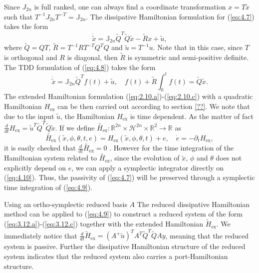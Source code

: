 Since $J_{2n}$ is full ranked, one can always find a coordinate transformation $ x= T \tilde x$ such that $T^{-1} J_{2n} T^{-T} = \mathbb J_{2n}$. The dissipative Hamiltonian formulation for (\ref{eq:4.7}) takes the form
\begin{equation} \label{eq:4.8}
	\dot {\tilde x} = \mathbb J_{2n} \tilde Q^T\tilde Q \tilde x - \tilde Rx + \tilde u,
\end{equation}
where $\tilde Q = QT$, $\tilde R = T^{-1}RT^{-T}Q^TQ$ and $\tilde u = T^{-1} u$. Note that in this case, since $T$ is orthogonal and $R$ is diagonal, then $\tilde R$ is symmetric and semi-positive definite. The TDD formulation of (\ref{eq:4.8}) takes the form
\begin{equation} \label{eq:4.9}
	\dot{\tilde x} = \mathbb{J}_{2n} \tilde Q^T f(t) + \tilde u, \quad f(t) + \tilde R \int_0^t f(t) = \tilde Q \tilde x.
\end{equation}
The extended Hamiltonian formulation (\ref{eq:2.10.a})-(\ref{eq:2.10.c}) with a quadratic Hamiltonian $H_{\text{ex}}$ can be then carried out according to section \ref{??}. We note that due to the input $\tilde u$, the Hamiltonian $H_{\text{ex}}$ is time dependent. As the matter of fact $\frac{d}{dt} H_{\text{ex}} = \tilde u^T\tilde Q^T \tilde Q \tilde x$. If we define $\overset{\circ}{H}_{\text{ex}} : \mathbb R^{2n}\times \mathcal H^{2n}\times \mathbb R^{2}\to \mathbb R$ as
\begin{equation} \label{eq:4.10}
	\overset{\circ}{H}_{\text{ex}}(\tilde x,\phi,\theta,t,e) = H_{\text{ex}}(\tilde x,\phi,\theta,t) + e, \quad \dot e = - \partial_t H_{\text{ex}},
\end{equation}
it is easily checked that $\frac d {dt} \overset{\circ}{H}_{\text{ex}} =0$ \cite{Hairer:1250576}. However for the time integration of the Hamiltonian system related to $\overset{\circ}{H}_{\text{ex}}$, since the evolution of $\tilde x$, $\phi$ and $\theta$ does not explicitly depend on $e$, we can apply a symplectic integrator directly on (\ref{eq:4.10}). Thus, the passivity of (\ref{eq:4.7}) will be preserved through a symplectic time integration of (\ref{eq:4.9}).

Using an ortho-symplectic reduced basis $A$ The reduced dissipative Hamiltonian method can be applied to (\ref{eq:4.9}) to construct a reduced system of the form (\ref{eq:3.12.a})-(\ref{eq:3.12.c}) together with the extended Hamiltonian $\tilde H_{\text{ex}}$. We immediately notice that $\frac{d}{dt} \tilde H_{\text{ex}} = (A^+ \tilde u)^T A^T \tilde Q^T \tilde Q A y$, meaning that the reduced system is passive. Further the dissipative Hamiltonian structure of the reduced system indicates that the reduced system also carries a port-Hamiltonian structure.

